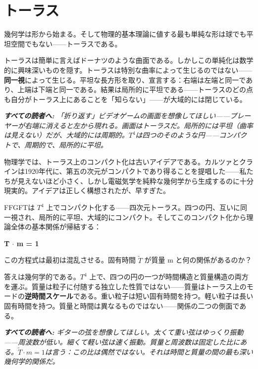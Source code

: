 \documentclass[11pt,openany]{book}
\newenvironment{laierspur}{%
  \par\vspace{4pt}%
  \noindent\small\itshape\color{blue!60!black}%
  \textbf{すべての読者へ:}\enspace\ignorespaces}{%
  \par\vspace{4pt}\normalsize\normalfont\normalcolor}
\begin{document}
\medskip

\chapter{トーラス}

幾何学は形から始まる。そして物理的基本理論に値する最も単純な形は球でも平坦空間でもない——トーラスである。

トーラスは簡単に言えばドーナツのような曲面である。しかしこの単純化は数学的に興味深いものを隠す。トーラスは特別な曲率によって生じるのではない——\textbf{同一視}によって生じる。平坦な長方形を取り、宣言する：右端は左端と同一であり、上端は下端と同一である。結果は局所的に平坦である——トーラスのどの点も自分がトーラス上にあることを「知らない」——が大域的には閉じている。

\begin{laierspur}
「折り返す」ビデオゲームの画面を想像してほしい——プレーヤーが右端に消えると左から現れる。画面はトーラスだ。局所的には平坦（曲率は見えない）だが、大域的には周期的。$T^4$は四つのそのような円——コンパクトで、周期的で、局所的に平坦。
\end{laierspur}

物理学では、トーラス上のコンパクト化は古いアイデアである。カルツァとクラインは1920年代に、第五の次元がコンパクトであり得ることを提唱した——私たちが見えないほど小さく、しかし電磁気学を純粋な幾何学から生成するのに十分現実的。アイデアは正しく構想されたが、早すぎた。

FFGFTは $T^4$ 上でコンパクト化する——四次元トーラス。四つの円、互いに同一視され、局所的に平坦、大域的にコンパクト。そしてこのコンパクト化から理論全体の基本関係が帰結する：

\textbf{T̃ $\cdot$ m = 1}

この方程式は最初は混乱させる。固有時間 $\tilde{T}$ が質量 m と何の関係があるのか？

答えは幾何学的である。$T^4$ 上で、四つの円の一つが時間構造と質量構造の両方を運ぶ。質量は粒子に付随する独立した性質ではない——質量はトーラス上のモードの\textbf{逆時間スケール}である。重い粒子は短い固有時間を持つ。軽い粒子は長い固有時間を持つ。質量と時間は異なるものではない——関係の二つの側面である。

\begin{laierspur}
ギターの弦を想像してほしい。太くて重い弦はゆっくり振動——周波数が低い。細くて軽い弦は速く振動。質量と周波数は固定した比にある。$\tilde{T}\cdot m = 1$は言う：この比は偶然ではない。それは時間と質量の間の最も深い幾何学的関係だ。
\end{laierspur}
\end{document}
